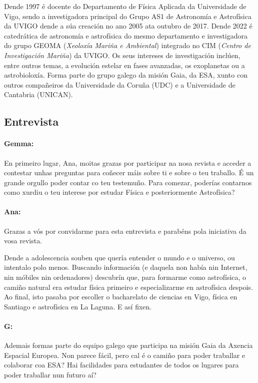 \begin{refsection}
\begin{multicols}{2}
Dende 1997 é docente do Departamento de Física Aplicada da Universidade de
Vigo, sendo a investigadora principal do Grupo AS1 de Astronomía e Astrofísica
da UVIGO dende a súa creación no ano 2005 ata outubro de 2017. Dende 2022 é
catedrática de astronomía e astrofísica do mesmo departamento e investigadora
do grupo GEOMA (\textit{Xeoloxía Mariña e Ambiental}) integrado no CIM
(\textit{Centro de Investigación Mariña}) da UVIGO. Os seus intereses de
investigación inclúen, entre outros temas, a evolución estelar en fases avanzadas, os exoplanetas ou a astrobioloxía. Forma parte do grupo galego da misión Gaia, da ESA, xunto con outros compañeiros da Universidade da Coruña (UDC) e a Universidade de Cantabria (UNICAN).

\subsection*{Entrevista}

\paragraph{Gemma:} En primeiro lugar, Ana, moitas grazas por participar na nosa
revista e acceder a contestar unhas preguntas para coñecer máis sobre ti e
sobre o teu traballo. É un grande orgullo poder contar co teu testemuño. Para
comezar, poderías contarnos como xurdiu o teu interese por estudar Física e
posteriormente Astrofísica?

\paragraph{Ana:} Grazas a vós por convidarme para esta entrevista e parabéns pola
iniciativa da vosa revista.

Dende a adolescencia souben que quería entender o mundo e o universo, ou
intentalo polo menos. Buscando información (e daquela non había nin Internet,
nin móbiles nin ordenadores) descubrín que, para formarme como astrofísica, o
camiño natural era estudar física primeiro e especializarme en astrofísica
despois. Ao final, isto pasaba por escoller o bacharelato de ciencias en Vigo,
física en Santiago e astrofísica en La Laguna. E así fixen.

\paragraph{G:} Ademais formas parte do equipo galego que participa na misión Gaia
da Axencia Espacial Europea. Non parece fácil, pero cal é o camiño para poder
traballar e colaborar coa ESA? Hai facilidades para estudantes de todos os
lugares para poder traballar nun futuro aí?


\end{multicols}
\end{refsection}
